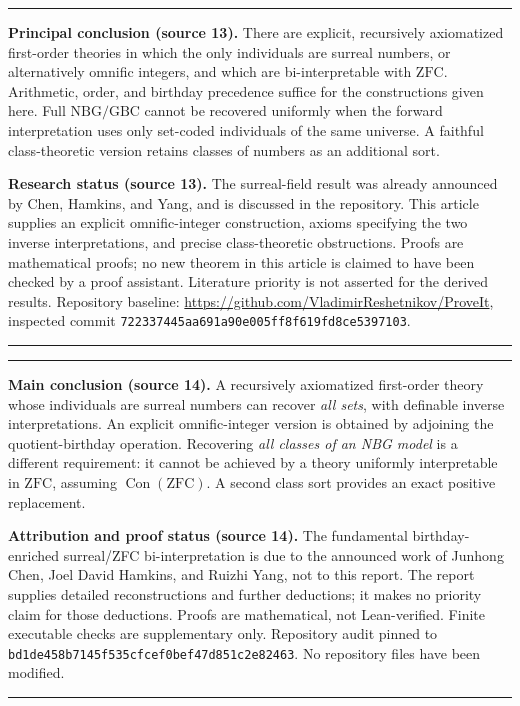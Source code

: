 \documentclass[11pt,letterpaper]{article}
\theoremstyle{definition}
\theoremstyle{remark}
\newcommand{\ZFC}{\mathrm{ZFC}}
\newcommand{\GBC}{\mathrm{GBC}}
\newcommand{\NBG}{\mathrm{NBG}}
\newcommand{\Con}{\operatorname{Con}}
\newenvironment{resultbox}{\par\medskip\noindent\begin{minipage}{\linewidth}\setlength{\parindent}{0pt}\hrule\medskip}{\medskip\hrule\end{minipage}\par\medskip}
\begin{document}
\begin{resultbox}
\textbf{Principal conclusion (source 13).} There are explicit, recursively
axiomatized first-order theories in which the only individuals are surreal
numbers, or alternatively omnific integers, and which are bi-interpretable with
$\ZFC$. Arithmetic, order, and birthday precedence suffice for the constructions
given here. Full $\NBG/\GBC$ cannot be recovered uniformly when the forward
interpretation uses only set-coded individuals of the same universe. A faithful
class-theoretic version retains classes of numbers as an additional sort.

\medskip
\textbf{Research status (source 13).} The surreal-field result was already
announced by Chen, Hamkins, and Yang, and is discussed in the repository. This
article supplies an explicit omnific-integer construction, axioms specifying the
two inverse interpretations, and precise class-theoretic obstructions. Proofs are
mathematical proofs; no new theorem in this article is claimed to have been
checked by a proof assistant. Literature priority is not asserted for the derived
results. Repository baseline: \url{https://github.com/VladimirReshetnikov/ProveIt},
inspected commit \texttt{722337445aa691a90e005ff8f619fd8ce5397103}.
\end{resultbox}

\begin{resultbox}
\textbf{Main conclusion (source 14).} A recursively axiomatized first-order theory
whose individuals are surreal numbers can recover \emph{all sets}, with definable
inverse interpretations. An explicit omnific-integer version is obtained by
adjoining the quotient-birthday operation. Recovering \emph{all classes of an
NBG model} is a different requirement: it cannot be achieved by a theory
uniformly interpretable in $\ZFC$, assuming $\Con(\ZFC)$. A second class sort
provides an exact positive replacement.

\medskip
\textbf{Attribution and proof status (source 14).} The fundamental
birthday-enriched surreal/ZFC bi-interpretation is due to the announced work of
Junhong Chen, Joel David Hamkins, and Ruizhi Yang, not to this report. The report
supplies detailed reconstructions and further deductions; it makes no priority
claim for those deductions. Proofs are mathematical, not Lean-verified. Finite
executable checks are supplementary only. Repository audit pinned to
\texttt{bd1de458b7145f535cfcef0bef47d851c2e82463}. No repository files have been
modified.
\end{resultbox}
\end{document}

